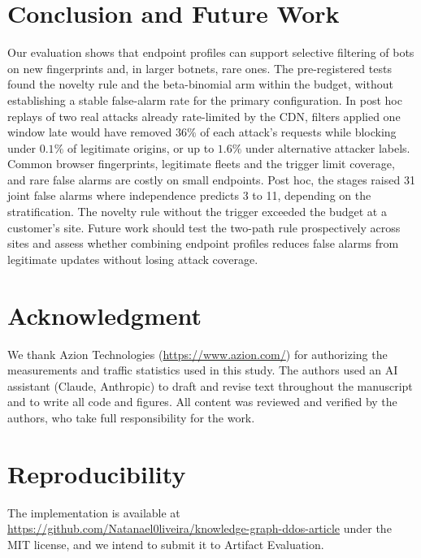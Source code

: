 \documentclass[conference,letterpaper,10pt]{IEEEtran}
\newcommand\1{\textit{(i)}}
\newcommand\2{\textit{(ii)}}
\newcommand\3{\textit{(iii)}}
\newcommand\4{\textit{(iv)}}
\newcommand\5{\textit{(v)}}
\newcommand\6{\textit{(vi)}}
\newcommand\7{\textit{(vii)}}
\newcommand\8{\textit{(viii)}}
\newcommand\9{\textit{(ix)}}
\begin{document}

\section{Conclusion and Future Work}
\label{sec:conclusion}

Our evaluation shows that endpoint profiles can support selective filtering of bots on new fingerprints and, in larger botnets, rare ones. The pre-registered tests found the novelty rule and the beta-binomial arm within the budget, without establishing a stable false-alarm rate for the primary configuration. In post hoc replays of two real attacks already rate-limited by the CDN, filters applied one window late would have removed $36\%$ of each attack's requests while blocking under $0.1\%$ of legitimate origins, or up to $1.6\%$ under alternative attacker labels. Common browser fingerprints, legitimate fleets and the trigger limit coverage, and rare false alarms are costly on small endpoints. Post hoc, the stages raised 31 joint false alarms where independence predicts 3 to 11, depending on the stratification. The novelty rule without the trigger exceeded the budget at a customer's site. Future work should test the two-path rule prospectively across sites and assess whether combining endpoint profiles reduces false alarms from legitimate updates without losing attack coverage.



\section*{Acknowledgment}

We thank Azion Technologies (\url{https://www.azion.com/})
for authorizing the measurements and traffic statistics
used in this study. The authors used an AI assistant (Claude, Anthropic) to draft and revise text throughout the manuscript and to write all code and figures. All content was reviewed and verified by the authors, who take full responsibility for the work.

\section*{Reproducibility}

The implementation is available at \url{https://github.com/Natanael0liveira/knowledge-graph-ddos-article} under the MIT license, and we intend to submit it to Artifact Evaluation.
\end{document}
